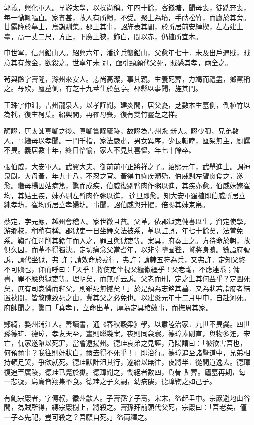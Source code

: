 \begin{pinyinscope}
 郭義，興化軍人。早游太學，以操尚稱。年四十餘，客錢塘，聞母喪，徒跣奔喪，每一慟輒嘔血。家貧甚，故人有所饋，不受。聚土為墳，手蒔松竹，而廬於其旁。甘露降於墓上，烏鵲馴集。郡上其事，詔旌表其閭，於所居前安綽楔，左右建土臺，高一丈二尺，方正，下廣上狹，飾白，間以赤，仍植所宜木。



 申世寧，信州鉛山人。紹興六年，潘達兵襲鉛山，父愈年七十，未及出戶遇賊，賊意其有藏金，欲殺之。世寧年未
 冠，亟引頸願代父死，賊感其孝，兩全之。



 茍與齡字壽隆，滁州來安人。志尚高潔，事其親，生養死葬，力竭而禮盡，鄉黨稱之。母歿，廬墓側，有芝十九莖生於墓亭。郡縣以事聞，旌其門。



 王珠字仲淵，吉州龍泉人，以孝謹聞。建炎間，居父憂，芝數本生墓側，倒植竹以為杙，復生柯葉。紹興間，再罹母喪，復有雙竹靈芝之祥。



 顏詡，唐太師真卿之後。真卿嘗謫廬陵，故詡為吉州永
 新人。詡少孤，兄弟數人，事繼母以孝聞。一門千指，家法嚴肅，男女異序，少長輯睦，匜架無主，廚饌不異。義居數十年，終日怡愉，家人不見其喜慍。年七十餘卒。



 張伯威，大安軍人。武翼大夫、御前前軍正將祥之子。紹熙元年，武舉進士。調神泉尉。大母黃，年九十八，不忍之官。黃得血痢疾瀕殆，伯威剔左臂肉食之，遂愈。繼母楊因姑病篤，驚而成疾，伯威復剔臂肉作粥以進，其疾亦愈。伯威妹嫁崔均，其姑王疾，妹亦剔左臂肉作粥以進，
 達旦即愈。知大安軍羅植即伯威所居立純孝坊，崔均所居立孝婦坊。事聞，詔伯威與升擢，倍賜其妹束帛。



 蔡定，字元應，越州會稽人。家世微且貧。父革，依郡獄吏傭書以生，資定使學，游鄉校，稍稍有稱。郡獄吏一日坐舞文法被系，革以詿誤，年七十餘矣，法當免系。鞫胥任澤削其籍年而入之，罪且與獄吏等。案具，府奏上之。方待命於朝，故俱久囚，而革不得獨決。定切痛念父當耆年，以非辜墮圄狴，誓將身贖。數詣府號訴，請代坐獄，弗
 許；請效命於戎行，弗許；請隸五符為兵，又弗許。定知父終不可贖也，仰而呼曰：「天乎！將使定坐視父纏徽纆乎！父老耄，不應連系；傭書，罪不應與獄吏等。理明矣，而無所云訴。父老而刑，定之生其何益乎？定圖死矣，庶有司哀憐而釋父，則雖死無憾矣！」於是預為志銘其墓，又為狀若詣府者結置袂間，皆敘陳致死之由，冀其父之必免也。以建炎元年十二月甲申，自赴河死。府帥聞之，驚曰「真孝」，立命出革，厚為定具棺斂事，而撫周其家。



 鄭綺，婺州浦江人。善讀書，通《春秋穀梁》學。以肅睦治家，九世不異爨。四世孫德珪、德璋，孝友天至，晝則聯幾案，夜則同衾寢。德璋素剛直，與物多迕，宋亡，仇家遂陷以死罪，當會逮揚州。德珪哀弟之見誣，乃陽謂曰：「彼欲害吾也，何預爾事？我往則奸狀白，爾去得不死乎！」即治行。德璋追至諸暨道中，兄弟相持頓足哭，爭欲就死。德珪默計沮其行，遂紿以無往，夜將半，從間道逸去。德璋復追至廣陵，德珪已斃於獄。德璋聞之，慟絕者數四，負骨
 歸葬。廬墓再期，每一悲號，烏鳥皆翔集不食。德珪之子文嗣，幼病僂，德璋鞫之如己子。



 有鮑宗巖者，字傅叔，徽州歙人。子壽孫字子壽。宋末，盜起里中。宗巖避地山谷間，為賊所得，縛宗巖樹上，將殺之。壽孫拜前願代父死，宗巖曰：「吾老矣，僅一子奉先祀，豈可殺之？吾願自死。」盜兩釋之。



\end{pinyinscope}